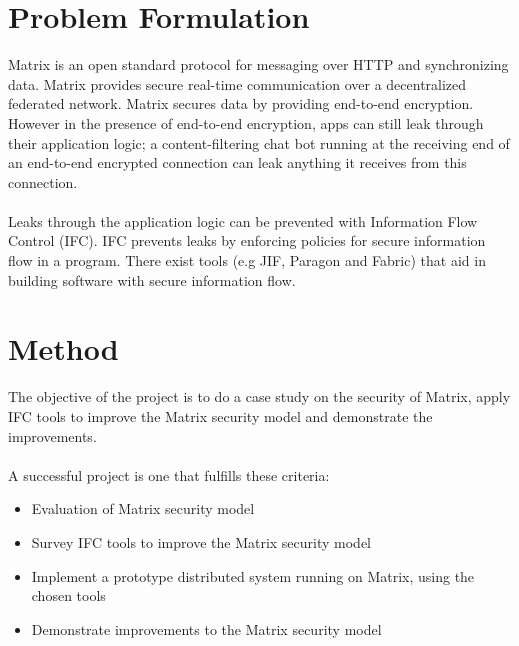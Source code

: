\section{Problem Formulation} 
Matrix is an open standard protocol for messaging over HTTP and synchronizing data. Matrix provides secure real-time communication over a decentralized federated network. Matrix secures data by providing end-to-end encryption. However in the presence of end-to-end encryption, apps can still leak through their application logic; a content-filtering chat bot running at the receiving end of an end-to-end encrypted connection can leak anything it receives from this connection.
\\
\\
Leaks through the application logic can be prevented with Information Flow Control (IFC). IFC prevents leaks by enforcing policies for secure information flow in a program. There exist tools (e.g JIF, Paragon and Fabric) that aid in building software with secure information flow. 

\section{Method}
The objective of the project is to do a case study on the security of Matrix, apply IFC tools to improve the Matrix security model and demonstrate the improvements.
\\
\\
A successful project is one that fulfills these criteria: 



\begin{itemize}
\item Evaluation of Matrix security model
\item Survey IFC tools to improve the Matrix security model
\item Implement a prototype distributed system running on Matrix, using the chosen tools
\item Demonstrate improvements to the Matrix security model
\end{itemize}   

